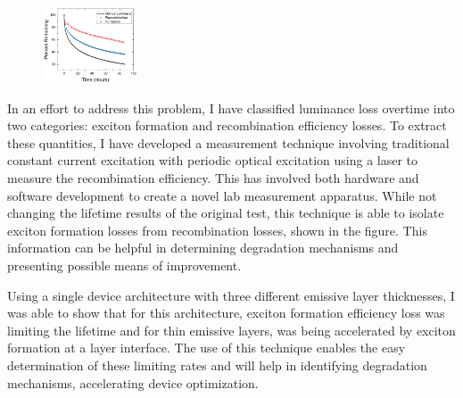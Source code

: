 \documentclass[a4paper,titlepage]{article}
\begin{document}
\begin{figure}
\vspace{-15pt}
\includegraphics[width=0.25\textwidth]{lifetime}
\vspace{-20pt}
\end{figure}

In an effort to address this problem, I have classified luminance loss overtime into two categories:  exciton formation and recombination efficiency losses.  To extract these quantities, I have developed a measurement technique involving traditional constant current excitation with periodic optical excitation using a laser to measure the recombination efficiency.  This has involved both hardware and software development to create a novel lab measurement apparatus.  While not changing the lifetime results of the original test, this technique is able to isolate exciton formation losses from recombination losses, shown in the figure.  This information can be helpful in determining degradation mechanisms and presenting possible means of improvement.

Using a single device architecture with three different emissive layer thicknesses, I was able to show that for this architecture, exciton formation efficiency loss was limiting the lifetime and for thin emissive layers, was being accelerated by exciton formation at a layer interface.  The use of this technique enables the easy determination of these limiting rates and will help in identifying degradation mechanisms, accelerating device optimization.
\end{document}
